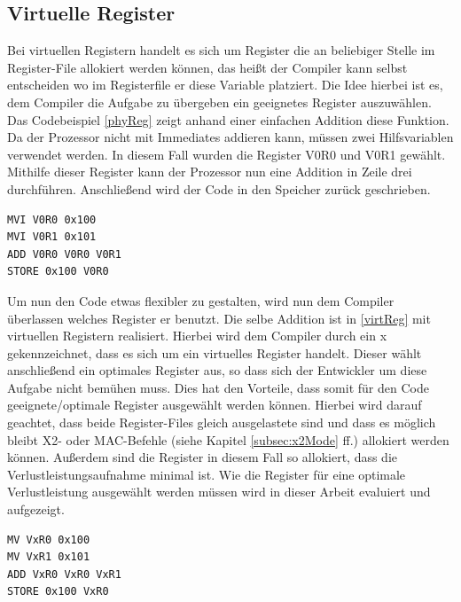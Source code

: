 \subsection{Virtuelle Register}
\label{sub:virtuelleR}
Bei virtuellen Registern handelt es sich um Register die an beliebiger Stelle im Register-File allokiert werden können, das heißt der Compiler kann selbst entscheiden wo im Registerfile er diese Variable platziert. 
Die Idee hierbei ist es, dem Compiler die Aufgabe zu übergeben ein geeignetes Register auszuwählen. Das Codebeispiel \ref{phyReg} zeigt anhand einer einfachen Addition diese Funktion. Da der Prozessor nicht mit Immediates addieren kann, müssen zwei Hilfsvariablen verwendet werden. In diesem Fall wurden die Register V0R0 und V0R1 gewählt. Mithilfe dieser Register kann der Prozessor nun eine Addition in Zeile drei durchführen. Anschließend wird der Code in den Speicher zurück geschrieben.
\newpage
\renewcommand{\lstlistingname}{Codebeispiel}
\begin{lstlisting}[frame=single, caption={physikalische Register},captionpos=b,label=phyReg]
MVI V0R0 0x100
MVI V0R1 0x101
ADD V0R0 V0R0 V0R1
STORE 0x100 V0R0
\end{lstlisting}
Um nun den Code etwas flexibler zu gestalten, wird  nun dem Compiler überlassen welches Register er benutzt. Die selbe Addition ist in \ref{virtReg} mit virtuellen Registern realisiert. Hierbei wird dem Compiler durch ein  x gekennzeichnet, dass es sich um ein virtuelles Register handelt. Dieser wählt anschließend ein optimales Register aus, so dass sich der Entwickler um diese Aufgabe nicht bemühen muss. Dies hat den Vorteile, dass somit für den Code geeignete/optimale Register ausgewählt werden können. Hierbei wird darauf geachtet, dass beide Register-Files gleich ausgelastete sind und dass es möglich bleibt X2- oder MAC-Befehle (siehe Kapitel \ref{subsec:x2Mode} ff.) allokiert werden können. Außerdem sind die Register in diesem Fall so allokiert, dass die Verlustleistungsaufnahme minimal ist. Wie die Register für eine optimale Verlustleistung ausgewählt werden müssen wird in dieser Arbeit evaluiert und aufgezeigt.

\begin{lstlisting}[frame=single,caption={virtuelle Register},captionpos=b,label=virtReg]
MV VxR0 0x100
MV VxR1 0x101
ADD VxR0 VxR0 VxR1
STORE 0x100 VxR0
\end{lstlisting}
